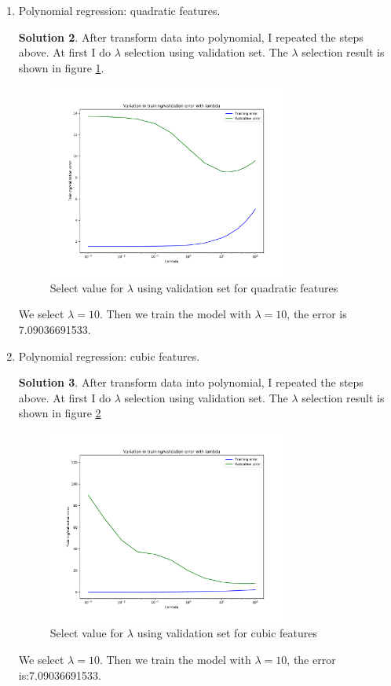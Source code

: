 \documentclass[]{book}
\theoremstyle{definition}
\newtheorem*{soln}{Solution}
\begin{document}
\begin{enumerate}
\begin{soln}
	\end{soln}
	\item Polynomial regression: quadratic features.
	\begin{soln}
		After transform data into polynomial, I repeated the steps above. At first I do $\lambda$ selection using validation set. The $\lambda$ selection result is shown in figure \ref{fig:select_lambda_2}.
		\begin{figure}[H]
			\centering
			\includegraphics[width=8cm]{imgs//select_lambda_2.pdf}
			\caption{Select value for $\lambda$ using validation set for quadratic features}
			\label{fig:select_lambda_2}
		\end{figure}
		We select $\lambda = 10$. Then we train the model with $\lambda = 10$, the error is 7.09036691533.
	\end{soln}
	\item Polynomial regression: cubic features.
	\begin{soln}
		After transform data into polynomial, I repeated the steps above. At first I do $\lambda$ selection using validation set. The $\lambda$ selection result is shown in figure \ref{fig:select_lambda_3}
		\begin{figure}[H]
			\centering
			\includegraphics[width=8cm]{imgs//select_lambda_3.pdf}
			\caption{Select value for $\lambda$ using validation set for cubic features}
			\label{fig:select_lambda_3}
		\end{figure}
		We select $\lambda = 10$. Then we train the model with $\lambda = 10$, the error is:7.09036691533.
	\end{soln}
\end{enumerate}
\end{document}
